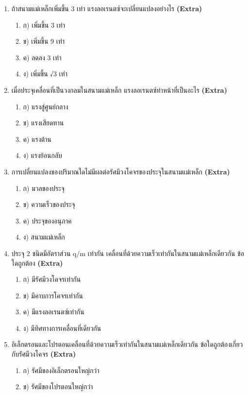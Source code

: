 \documentclass[12pt]{article}
\begin{document}
\begin{enumerate}[label=\arabic*.]
\begin{enumerate}[label=)]
\item ง) ทิศบน
\end{enumerate}
\item ถ้าสนามแม่เหล็กเพิ่มขึ้น 3 เท่า แรงลอเรนตซ์จะเปลี่ยนแปลงอย่างไร \hfill \textbf{\small (Extra)}
\begin{enumerate}[label=)]
\item ก) เพิ่มขึ้น 3 เท่า
\item ข) เพิ่มขึ้น 9 เท่า
\item ค) ลดลง 3 เท่า
\item ง) เพิ่มขึ้น √3 เท่า
\end{enumerate}
\item เมื่อประจุเคลื่อนที่เป็นวงกลมในสนามแม่เหล็ก แรงลอเรนตซ์ทำหน้าที่เป็นอะไร \hfill \textbf{\small (Extra)}
\begin{enumerate}[label=)]
\item ก) แรงสู่ศูนย์กลาง
\item ข) แรงเสียดทาน
\item ค) แรงต้าน
\item ง) แรงย้อนกลับ
\end{enumerate}
\item การเปลี่ยนแปลงของปริมาณใดไม่มีผลต่อรัศมีวงโคจรของประจุในสนามแม่เหล็ก \hfill \textbf{\small (Extra)}
\begin{enumerate}[label=)]
\item ก) มวลของประจุ
\item ข) ความเร็วของประจุ
\item ค) ประจุของอนุภาค
\item ง) สนามแม่เหล็ก
\end{enumerate}
\item ประจุ 2 ชนิดมีอัตราส่วน q/m เท่ากัน เคลื่อนที่ด้วยความเร็วเท่ากันในสนามแม่เหล็กเดียวกัน ข้อใดถูกต้อง \hfill \textbf{\small (Extra)}
\begin{enumerate}[label=)]
\item ก) มีรัศมีวงโคจรเท่ากัน
\item ข) มีคาบการโคจรเท่ากัน
\item ค) มีแรงลอเรนตซ์เท่ากัน
\item ง) มีทิศทางการเคลื่อนที่เดียวกัน
\end{enumerate}
\item อิเล็กตรอนและโปรตอนเคลื่อนที่ด้วยความเร็วเท่ากันในสนามแม่เหล็กเดียวกัน ข้อใดถูกต้องเกี่ยวกับรัศมีวงโคจร \hfill \textbf{\small (Extra)}
\begin{enumerate}[label=)]
\item ก) รัศมีของอิเล็กตรอนใหญ่กว่า
\item ข) รัศมีของโปรตอนใหญ่กว่า

\end{enumerate}
\end{enumerate}
\end{document}
